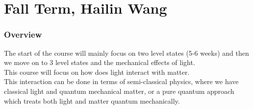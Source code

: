\chapter{Fall Term, Hailin Wang}
\subsection{Overview}
The start of the course will mainly focus on two level states (5-6 weeks) and then we move on to 3 level states and the mechanical effects of light. \\
This course will focus on how does light interact with matter.\\
This interaction can be done in terms of semi-classical physics, where we have classical light and quantum mechanical matter, or a pure quantum approach which treats both light and matter quantum mechanically.\\


